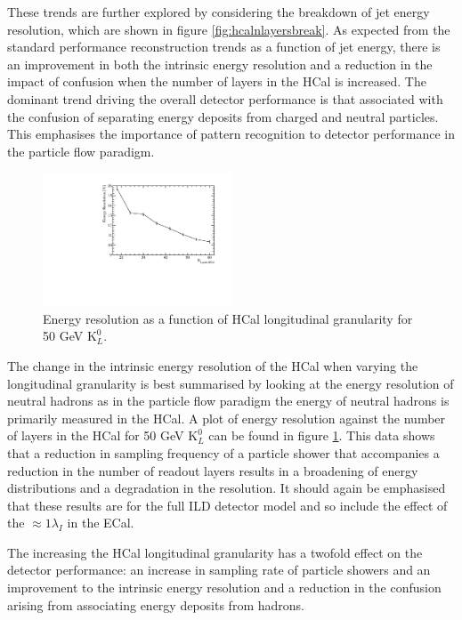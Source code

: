 These trends are further explored by considering the breakdown of jet energy resolution, which are shown in figure \ref{fig:hcalnlayersbreak}.  As expected from the standard performance reconstruction trends as a function of jet energy, there is an improvement in both the intrinsic energy resolution and a reduction in the impact of confusion when the number of layers in the HCal is increased.  The dominant trend driving the overall detector performance is that associated with the confusion of separating energy deposits from charged and neutral particles.  This emphasises the importance of pattern recognition to detector performance in the particle flow paradigm.    

\begin{figure}
\centering
\includegraphics[width=0.5\textwidth]{OptimisationStudies/Plots/EnergyResolution/ER_vs_HCalLayerNumber_50GeVKaon0L.pdf}
\caption[Energy resolution as a function of HCal longitudinal granularity for 50 GeV $\text{K}^{0}_{L}$.]{Energy resolution as a function of HCal longitudinal granularity for 50 GeV $\text{K}^{0}_{L}$.}
\label{fig:hcalnlayers}
\end{figure}

The change in the intrinsic energy resolution of the HCal when varying the longitudinal granularity is best summarised by looking at the energy resolution of neutral hadrons as in the particle flow paradigm the energy of neutral hadrons is primarily measured in the HCal.  A plot of energy resolution against the number of layers in the HCal for 50 GeV $\text{K}^{0}_{L}$ can be found in figure \ref{fig:hcalnlayers}.  This data shows that a reduction in sampling frequency of a particle shower that accompanies a reduction in the number of readout layers results in a broadening of energy distributions and a degradation in the resolution.  It should again be emphasised that these results are for the full ILD detector model and so include the effect of the $\approx 1 \lambda_{I}$ in the ECal.  

The increasing the HCal longitudinal granularity has a twofold effect on the detector performance: an increase in sampling rate of particle showers and an improvement to the intrinsic energy resolution and a reduction in the confusion arising from associating energy deposits from hadrons.  


